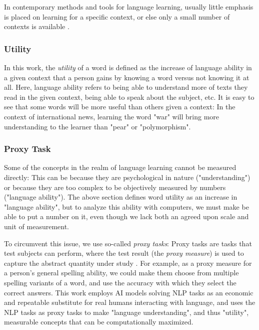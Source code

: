 In contemporary methods and tools for language learning, usually little emphasis is placed on learning for a specific context, or else only a small number of contexts is available .

\subsubsection{Utility} \label{sec:utility}
In this work, the \textit{utility} of a word is defined as the increase of language ability in a given context that a person gains by knowing a word versus not knowing it at all.
Here, language ability refers to being able to understand more of texts they read in the given context, being able to speak about the subject, etc.
It is easy to see that some words will be more useful than others given a context:
In the context of international news, learning the word "war" will bring more understanding to the learner than "pear" or "polymorphism".

\subsubsection{Proxy Task}
Some of the concepts in the realm of language learning cannot be measured directly:
This can be because they are psychological in nature ("understanding") or because they are too complex to be objectively measured by numbers ("language ability").
The above section defines word utility as an increase in "language ability", but to analyze this ability with computers, we must make be able to put a number on it, even though we lack both an agreed upon scale and unit of measurement.

To circumvent this issue, we use so-called \textit{proxy tasks}:
Proxy tasks are tasks that test subjects can perform, where the test result (the \textit{proxy measure}) is used to capture the abstract quantity under study .
For example, as a proxy measure for a person's general spelling ability, we could make them choose from multiple spelling variants of a word, and use the accuracy with which they select the correct answers.
This work employs AI models solving NLP tasks as an economic and repeatable substitute for real humans interacting with language, and uses the NLP tasks as proxy tasks to make "language understanding", and thus "utility", measurable concepts that can be computationally maximized.

